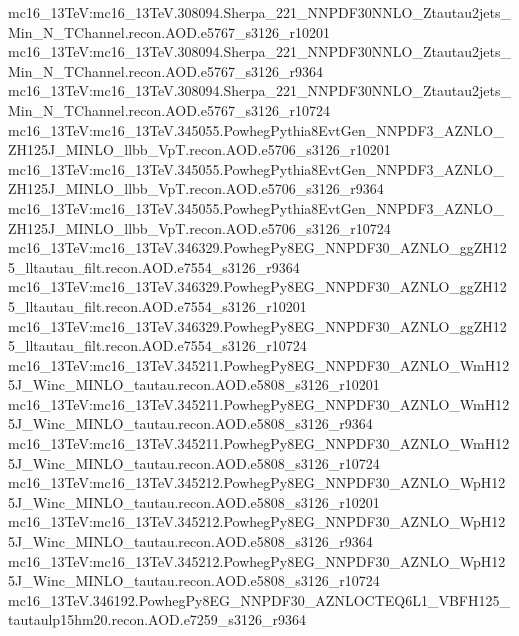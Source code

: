 { mc16\_13TeV:mc16\_13TeV.308094.Sherpa\_221\_NNPDF30NNLO\_Ztautau2jets\_Min\_N\_TChannel.recon.AOD.e5767\_s3126\_r10201   \newline  
 mc16\_13TeV:mc16\_13TeV.308094.Sherpa\_221\_NNPDF30NNLO\_Ztautau2jets\_Min\_N\_TChannel.recon.AOD.e5767\_s3126\_r9364 \newline    
 mc16\_13TeV:mc16\_13TeV.308094.Sherpa\_221\_NNPDF30NNLO\_Ztautau2jets\_Min\_N\_TChannel.recon.AOD.e5767\_s3126\_r10724  \newline  
 mc16\_13TeV:mc16\_13TeV.345055.PowhegPythia8EvtGen\_NNPDF3\_AZNLO\_ZH125J\_MINLO\_llbb\_VpT.recon.AOD.e5706\_s3126\_r10201  \newline   
 mc16\_13TeV:mc16\_13TeV.345055.PowhegPythia8EvtGen\_NNPDF3\_AZNLO\_ZH125J\_MINLO\_llbb\_VpT.recon.AOD.e5706\_s3126\_r9364  \newline   
 mc16\_13TeV:mc16\_13TeV.345055.PowhegPythia8EvtGen\_NNPDF3\_AZNLO\_ZH125J\_MINLO\_llbb\_VpT.recon.AOD.e5706\_s3126\_r10724  \newline   
 mc16\_13TeV:mc16\_13TeV.346329.PowhegPy8EG\_NNPDF30\_AZNLO\_ggZH125\_lltautau\_filt.recon.AOD.e7554\_s3126\_r9364 \newline    
 mc16\_13TeV:mc16\_13TeV.346329.PowhegPy8EG\_NNPDF30\_AZNLO\_ggZH125\_lltautau\_filt.recon.AOD.e7554\_s3126\_r10201  \newline   
 mc16\_13TeV:mc16\_13TeV.346329.PowhegPy8EG\_NNPDF30\_AZNLO\_ggZH125\_lltautau\_filt.recon.AOD.e7554\_s3126\_r10724  \newline   
 mc16\_13TeV:mc16\_13TeV.345211.PowhegPy8EG\_NNPDF30\_AZNLO\_WmH125J\_Winc\_MINLO\_tautau.recon.AOD.e5808\_s3126\_r10201  \newline   
 mc16\_13TeV:mc16\_13TeV.345211.PowhegPy8EG\_NNPDF30\_AZNLO\_WmH125J\_Winc\_MINLO\_tautau.recon.AOD.e5808\_s3126\_r9364 \newline    
 mc16\_13TeV:mc16\_13TeV.345211.PowhegPy8EG\_NNPDF30\_AZNLO\_WmH125J\_Winc\_MINLO\_tautau.recon.AOD.e5808\_s3126\_r10724 \newline    
 mc16\_13TeV:mc16\_13TeV.345212.PowhegPy8EG\_NNPDF30\_AZNLO\_WpH125J\_Winc\_MINLO\_tautau.recon.AOD.e5808\_s3126\_r10201  \newline   
 mc16\_13TeV:mc16\_13TeV.345212.PowhegPy8EG\_NNPDF30\_AZNLO\_WpH125J\_Winc\_MINLO\_tautau.recon.AOD.e5808\_s3126\_r9364  \newline   
 mc16\_13TeV:mc16\_13TeV.345212.PowhegPy8EG\_NNPDF30\_AZNLO\_WpH125J\_Winc\_MINLO\_tautau.recon.AOD.e5808\_s3126\_r10724 \newline    
mc16\_13TeV.346192.PowhegPy8EG\_NNPDF30\_AZNLOCTEQ6L1\_VBFH125\_tautaulp15hm20.recon.AOD.e7259\_s3126\_r9364\newline  
}
